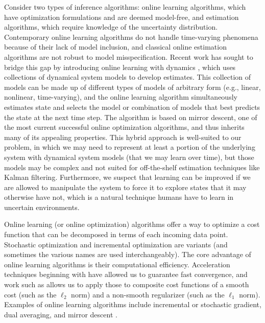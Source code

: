 \documentclass[12pt]{report}
\begin{document}
Consider two types of inference algorithms: online learning algorithms, which have optimization formulations and are deemed model-free, and estimation algorithms, which require knowledge of the uncertainty distribution. Contemporary online learning algorithms do not handle time-varying phenomena because of their lack of model inclusion, and classical online estimation algorithms are not robust to model misspecification. Recent work has sought to bridge this gap by introducing online learning with dynamics \cite{hall_online_2013, ledva2015inferring}, which uses collections of dynamical system models to develop estimates. This collection of models can be made up of different types of models of arbitrary form (e.g., linear, nonlinear, time-varying), and the online learning algorithm simultaneously estimates state and selects the model or combination of models that best predicts the state at the next time step. The algorithm is based on mirror descent, one of the most current successful online optimization algorithms, and thus inherits many of its appealing properties. This hybrid approach is well-suited to our problem, in which we may need to represent at least a portion of the underlying system with dynamical system models (that we may learn over time), but those models may be complex and not suited for off-the-shelf estimation techniques like Kalman filtering. Furthermore, we suspect that learning can be improved if we are allowed to manipulate the system to force it to explore states that it may otherwise have not, which is a natural technique humans have to learn in uncertain environments.

Online learning (or online optimization) algorithms \cite{nesterov1983method,nemirovsky1983problem} offer a way to optimize a cost function that can be decomposed in terms of each incoming data point. Stochastic optimization and incremental optimization are variants (and sometimes the various names are used interchangeably). The core advantage of online learning algorithms is their computational efficiency. Acceleration techniques beginning with \cite{nesterov1983method} have allowed us to guarantee fast convergence, and work such as \cite{nesterov2013gradient,beck2009fast} allows us to apply those to composite cost functions of a smooth cost (such as the $\ell_2$ norm) and a non-smooth regularizer (such as the $\ell_1$ norm). Examples of online learning algorithms include incremental or stochastic gradient, dual averaging, and mirror descent \cite{allen2014novel}.
\end{document}
